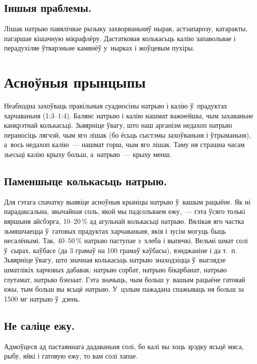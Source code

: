 \subsection{Іншыя праблемы.}
Лішак натрыю павялічвае рызыку захворваньняў нырак, астэапарозу, катаракты, пагаршае кішачную мікрафлёру. Дастатковая колькасьць калію запавольвае і перадухіляе ўтварэньне камянёў у~нырках і жоўцевым пухіры.

\section{Асноўныя прынцыпы}

Неабходна захоўваць правільныя суадносіны натрыю і калію ў~прадуктах харчаваньня (1:3--1:4). Балянс натрыю і калію нашмат важнейшы, чым захаваньне канкрэтнай колькасьці. Зьвярніце ўвагу, што наш арганізм недахоп натрыю пераносіць лягчэй, чым яго лішак (бо ёсьць сыстэмы захоўваньня і ўтрыманьня), а~вось недахоп калію~--- нашмат горш, чым яго лішак. Таму ня страшна часам зьесьці калію крыху больш, а~натрыю~--- крыху менш.


\subsection{Паменшыце колькасьць натрыю.}
Для гэтага спачатку выявіце асноўныя крыніцы натрыю ў~вашым рацыёне. Як ні парадаксальна, звычайная соль, якой мы падсольваем ежу,~--- гэта ўсяго толькі вяршыня айсбэрга, 10–20\,\% ад агульнай колькасьці натрыю. Вялікая яго частка зьмяшчаецца ў~гатовых прадуктах харчаваньня, якія і зусім могуць быць несалёнымі. Так, 40--50\,\% натрыю паступае з~хлеба і выпечкі. Вельмі шмат солі ў~сырах, каўбасе (да 3 грамаў на 100 грамаў каўбасы), вэнджаніне і да т.~п. Зьвярніце ўвагу, што значная колькасьць натрыю знаходзіцца ў~выглядзе шматлікіх харчовых дабавак: натрыю сорбат, натрыю бікарбанат, натрыю глутамат, натрыю бэнзаат. Гэта значыць, чым больш у~вашым рацыёне гатовай ежы, тым больш вы ясьцё натрыю. У~цэлым пажадана спажываць ня больш за 1500 мг натрыю ў~дзень.

\subsection{Не саліце ежу.}
Адмоўцеся ад пастаяннага дадаваньня солі, бо калі вы хоць зрэдку ясьцё мяса, рыбу, яйкі і гатовую ежу, то вам солі хапае.

